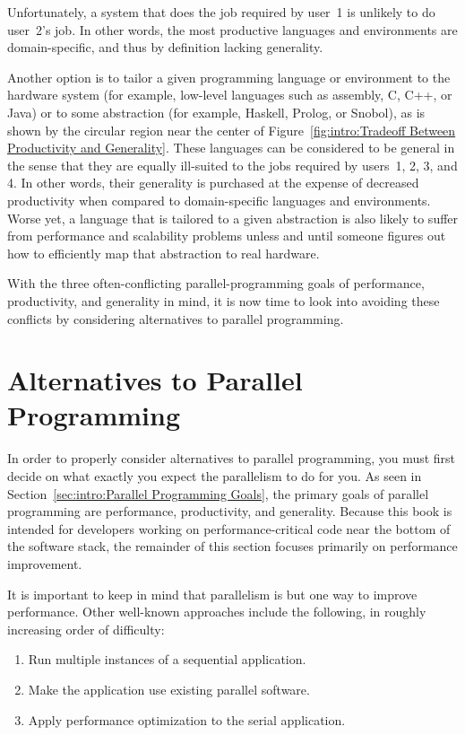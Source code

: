 Unfortunately, a system that does the job required by user~1 is
unlikely to do user~2's job.
In other words, the most productive languages and environments are
domain-specific, and thus by definition lacking generality.

Another option is to tailor a given programming language or environment
to the hardware system (for example, low-level languages such as
assembly, C, C++, or Java) or to some abstraction (for example,
Haskell, Prolog, or Snobol), as is shown by the circular region near
the center of
Figure~\ref{fig:intro:Tradeoff Between Productivity and Generality}.
These languages can be considered to be general in the sense that they
are equally ill-suited to the jobs required by users~1, 2, 3, and 4.
In other words, their generality is purchased at the expense of
decreased productivity when compared to domain-specific languages
and environments.
Worse yet, a language that is tailored to a given abstraction
is also likely to suffer from performance and scalability problems
unless and until someone figures out how to efficiently map that
abstraction to real hardware.

With the three often-conflicting parallel-programming goals of
performance, productivity,
and generality in mind, it is now time to look into avoiding these
conflicts by considering alternatives to
parallel programming.

\section{Alternatives to Parallel Programming}
\label{sec:intro:Alternatives to Parallel Programming}

In order to properly consider alternatives to parallel programming,
you must first decide on what exactly you expect the parallelism
to do for you.
As seen in Section~\ref{sec:intro:Parallel Programming Goals},
the primary goals of parallel programming are performance, productivity,
and generality.
Because this book is intended for developers working on
performance-critical code near the bottom of the software stack,
the remainder of this section focuses primarily on performance improvement.

It is important to keep in mind that parallelism is but one way to
improve performance.
Other well-known approaches include the following, in roughly increasing
order of difficulty:

\begin{enumerate}
\item	Run multiple instances of a sequential application.
\item	Make the application use existing parallel software.
\item	Apply performance optimization to the serial application.
\end{enumerate}

